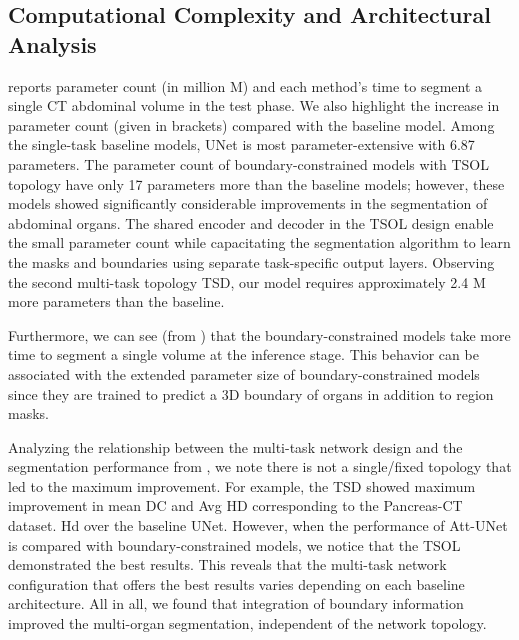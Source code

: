 \documentclass[final,5p,times,twocolumn]{elsarticle}
\begin{document}
\subsection{Computational Complexity and Architectural Analysis} 
 reports parameter count (in million M) and each method's time to segment a single CT abdominal volume in the test phase. We also highlight the increase in parameter count (given in brackets) compared with the baseline model. Among the single-task baseline models, UNet is most parameter-extensive with 6.87  parameters. The parameter count of boundary-constrained models with TSOL topology have only 17 parameters more than the baseline models; however, these models showed significantly considerable improvements in the segmentation of abdominal organs. The shared encoder and decoder in the TSOL design enable the small parameter count while capacitating the segmentation algorithm to learn the masks and boundaries using separate task-specific output layers. Observing the second multi-task topology TSD, our model requires approximately 2.4 M more parameters than the baseline. 

Furthermore, we can see (from ) that the boundary-constrained models take more time to segment a single volume at the inference stage. This behavior can be associated with the extended parameter size of boundary-constrained models since they are trained to predict a 3D boundary of organs in addition to region masks.

Analyzing the relationship between the multi-task network design and the segmentation performance from , we note there is not a single/fixed topology that led to the maximum improvement. For example, the TSD showed maximum improvement in mean DC and Avg HD corresponding to the Pancreas-CT dataset. Hd over the baseline UNet. However, when the performance of Att-UNet is compared with boundary-constrained models, we notice that the TSOL demonstrated the best results. This reveals that the multi-task network configuration that offers the best results varies depending on each baseline architecture. All in all, we found that integration of boundary information improved the multi-organ segmentation, independent of the network topology.
\end{document}
